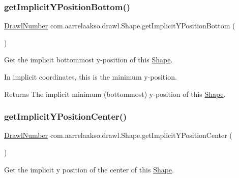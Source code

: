 \subsubsection{\texorpdfstring{get\+Implicit\+Y\+Position\+Bottom()}{getImplicitYPositionBottom()}}
{\footnotesize\ttfamily \hyperlink{classcom_1_1aarrelaakso_1_1drawl_1_1_drawl_number}{Drawl\+Number} com.\+aarrelaakso.\+drawl.\+Shape.\+get\+Implicit\+Y\+Position\+Bottom (\begin{DoxyParamCaption}{ }\end{DoxyParamCaption})\hspace{0.3cm}{\ttfamily [protected]}}



Get the implicit bottommost y-\/position of this \hyperlink{classcom_1_1aarrelaakso_1_1drawl_1_1_shape}{Shape}. 

In implicit coordinates, this is the minimum y-\/position.

\begin{DoxyReturn}{Returns}
The implicit minimum (bottommost) y-\/position of this \hyperlink{classcom_1_1aarrelaakso_1_1drawl_1_1_shape}{Shape}. 
\end{DoxyReturn}
\mbox{\label{classcom_1_1aarrelaakso_1_1drawl_1_1_shape_a0549739ee3201ae16091acce4ee6a5ac}} 
\subsubsection{\texorpdfstring{get\+Implicit\+Y\+Position\+Center()}{getImplicitYPositionCenter()}}
{\footnotesize\ttfamily \hyperlink{classcom_1_1aarrelaakso_1_1drawl_1_1_drawl_number}{Drawl\+Number} com.\+aarrelaakso.\+drawl.\+Shape.\+get\+Implicit\+Y\+Position\+Center (\begin{DoxyParamCaption}{ }\end{DoxyParamCaption})\hspace{0.3cm}{\ttfamily [protected]}}



Get the implicit y position of the center of this \hyperlink{classcom_1_1aarrelaakso_1_1drawl_1_1_shape}{Shape}. 

